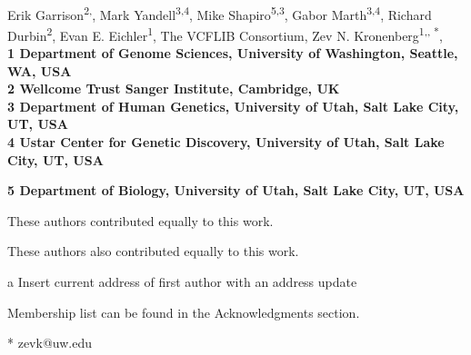 \documentclass[10pt,letterpaper]{article}
\date{}
\begin{document}
\vspace*{0.35in}

\begin{flushleft}
{\Large
\textbf{}
}
\newline
\\

Erik Garrison\textsuperscript{2,\Yinyang},
Mark Yandell\textsuperscript{3,4},
Mike Shapiro\textsuperscript{5,3},
Gabor Marth\textsuperscript{3,4},
Richard Durbin\textsuperscript{2},
Evan E. Eichler\textsuperscript{1},
The VCFLIB Consortium\textsuperscript{\textpilcrow},
Zev N. Kronenberg\textsuperscript{1,\Yinyang, *},
\\
\bigskip
\bf{1} Department of Genome Sciences, University of Washington, Seattle, WA, USA
\\
\bf{2} Wellcome Trust Sanger Institute, Cambridge, UK
\\
\bf{3} Department of Human Genetics, University of Utah, Salt Lake City, UT, USA
\\
\bf{4} Ustar Center for Genetic Discovery, University of Utah, Salt Lake City, UT, USA

\bf{5} Department of Biology, University of Utah, Salt Lake City, UT, USA
\\
\bigskip

% 
%
\Yinyang These authors contributed equally to this work.

\ddag These authors also contributed equally to this work.

\textcurrency a Insert current address of first author with an address update


\textpilcrow Membership list can be found in the Acknowledgments section.

* zevk@uw.edu

\end{flushleft}
\end{document}
